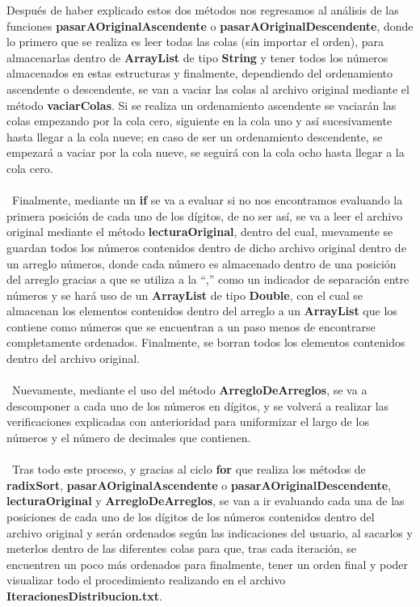 \documentclass[12pt,letterpaper]{report}
\begin{document}
Después de haber explicado estos dos métodos nos regresamos al análisis de las funciones \textbf{pasarAOriginalAscendente} o \textbf{pasarAOriginalDescendente}, donde lo primero que se realiza es leer todas las colas (sin importar el orden), para almacenarlas dentro de \textbf{ArrayList} de tipo \textbf{String} y tener todos los números almacenados en estas estructuras y finalmente, dependiendo del ordenamiento ascendente o descendente, se van a vaciar las colas al archivo original mediante el método \textbf{vaciarColas}. Si se realiza un ordenamiento ascendente se vaciarán las colas empezando por la cola cero, siguiente en la cola uno y así sucesivamente hasta llegar a la cola nueve; en caso de ser un ordenamiento descendente, se empezará a vaciar por la cola nueve, se seguirá con la cola ocho hasta llegar a la cola cero.\\\\\
Finalmente, mediante un \textbf{if} se va a evaluar si no nos encontramos evaluando la primera posición de cada uno de los dígitos, de no ser así, se va a leer el archivo original mediante el método \textbf{lecturaOriginal}, dentro del cual, nuevamente se guardan todos los números contenidos dentro de dicho archivo original dentro de un arreglo números, donde cada número es almacenado dentro de una posición del arreglo gracias a que se utiliza a la “,” como un indicador de separación entre números y se hará uso de un \textbf{ArrayList} de tipo \textbf{Double}, con el cual se almacenan los elementos contenidos dentro del arreglo a un \textbf{ArrayList} que los contiene como números que se encuentran a un paso menos de encontrarse completamente ordenados. Finalmente, se borran todos los elementos contenidos dentro del archivo original.\\\\\
Nuevamente, mediante el uso del método \textbf{ArregloDeArreglos}, se va a descomponer a cada uno de los números en dígitos, y se volverá a realizar las verificaciones explicadas con anterioridad para uniformizar el largo de los números y el número de decimales que contienen.\\\\\
Tras todo este proceso, y gracias al ciclo \textbf{for} que realiza los métodos de \textbf{radixSort}, \textbf{pasarAOriginalAscendente} o \textbf{pasarAOriginalDescendente}, \textbf{lecturaOriginal} y \textbf{ArregloDeArreglos}, se van a ir evaluando cada una de las posiciones de cada uno de los dígitos de los números contenidos dentro del archivo original y serán ordenados según las indicaciones del usuario, al sacarlos y meterlos dentro de las diferentes colas para que, tras cada iteración, se encuentren un poco más ordenados para finalmente, tener un orden final y poder visualizar todo el procedimiento realizando en el archivo \textbf{IteracionesDistribucion.txt}.
\end{document}
